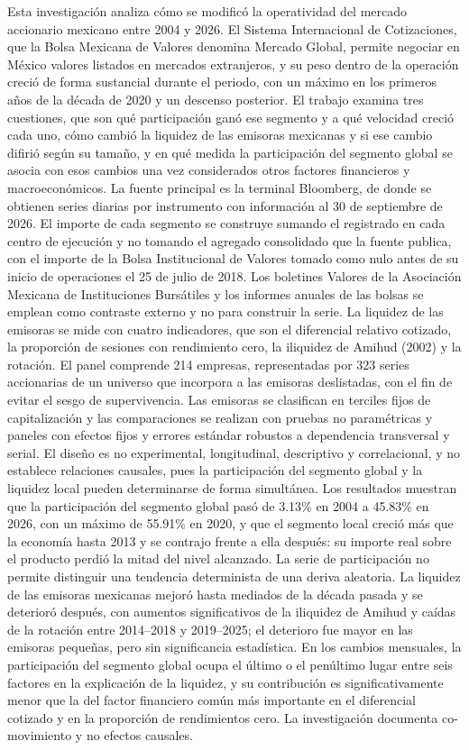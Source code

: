 
Esta investigación analiza cómo se modificó la operatividad del mercado accionario mexicano entre 2004 y 2026. El Sistema Internacional de Cotizaciones, que la Bolsa Mexicana de Valores denomina Mercado Global, permite negociar en México valores listados en mercados extranjeros, y su peso dentro de la operación creció de forma sustancial durante el periodo, con un máximo en los primeros años de la década de 2020 y un descenso posterior. El trabajo examina tres cuestiones, que son qué participación ganó ese segmento y a qué velocidad creció cada uno, cómo cambió la liquidez de las emisoras mexicanas y si ese cambio difirió según su tamaño, y en qué medida la participación del segmento global se asocia con esos cambios una vez considerados otros factores financieros y macroeconómicos. La fuente principal es la terminal Bloomberg, de donde se obtienen series diarias por instrumento con información al 30 de septiembre de 2026. El importe de cada segmento se construye sumando el registrado en cada centro de ejecución y no tomando el agregado consolidado que la fuente publica, con el importe de la Bolsa Institucional de Valores tomado como nulo antes de su inicio de operaciones el 25 de julio de 2018. Los boletines Valores de la Asociación Mexicana de Instituciones Bursátiles y los informes anuales de las bolsas se emplean como contraste externo y no para construir la serie. La liquidez de las emisoras se mide con cuatro indicadores, que son el diferencial relativo cotizado, la proporción de sesiones con rendimiento cero, la iliquidez de Amihud (2002) y la rotación. El panel comprende 214 empresas, representadas por 323 series accionarias de un universo que incorpora a las emisoras deslistadas, con el fin de evitar el sesgo de supervivencia. Las emisoras se clasifican en terciles fijos de capitalización y las comparaciones se realizan con pruebas no paramétricas y paneles con efectos fijos y errores estándar robustos a dependencia transversal y serial. El diseño es no experimental, longitudinal, descriptivo y correlacional, y no establece relaciones causales, pues la participación del segmento global y la liquidez local pueden determinarse de forma simultánea. Los resultados muestran que la participación del segmento global pasó de 3.13\% en 2004 a 45.83\% en 2026, con un máximo de 55.91\% en 2020, y que el segmento local creció más que la economía hasta 2013 y se contrajo frente a ella después: su importe real sobre el producto perdió la mitad del nivel alcanzado. La serie de participación no permite distinguir una tendencia determinista de una deriva aleatoria. La liquidez de las emisoras mexicanas mejoró hasta mediados de la década pasada y se deterioró después, con aumentos significativos de la iliquidez de Amihud y caídas de la rotación entre 2014--2018 y 2019--2025; el deterioro fue mayor en las emisoras pequeñas, pero sin significancia estadística. En los cambios mensuales, la participación del segmento global ocupa el último o el penúltimo lugar entre seis factores en la explicación de la liquidez, y su contribución es significativamente menor que la del factor financiero común más importante en el diferencial cotizado y en la proporción de rendimientos cero. La investigación documenta co-movimiento y no efectos causales.

